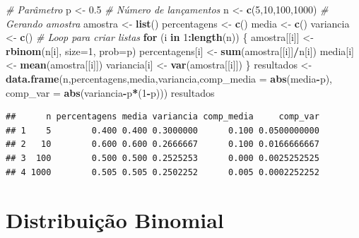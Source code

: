 \documentclass[
]{book}
\newenvironment{Shaded}{\begin{snugshade}}{\end{snugshade}}
\newcommand{\AttributeTok}[1]{\textcolor[rgb]{0.13,0.29,0.53}{#1}}
\newcommand{\CommentTok}[1]{\textcolor[rgb]{0.56,0.35,0.01}{\textit{#1}}}
\newcommand{\ControlFlowTok}[1]{\textcolor[rgb]{0.13,0.29,0.53}{\textbf{#1}}}
\newcommand{\DecValTok}[1]{\textcolor[rgb]{0.00,0.00,0.81}{#1}}
\newcommand{\FloatTok}[1]{\textcolor[rgb]{0.00,0.00,0.81}{#1}}
\newcommand{\FunctionTok}[1]{\textcolor[rgb]{0.13,0.29,0.53}{\textbf{#1}}}
\newcommand{\NormalTok}[1]{#1}
\newcommand{\OtherTok}[1]{\textcolor[rgb]{0.56,0.35,0.01}{#1}}
\newcommand{\SpecialCharTok}[1]{\textcolor[rgb]{0.81,0.36,0.00}{\textbf{#1}}}
\begin{document}
\begin{Shaded}
\begin{Highlighting}[]
\CommentTok{\# Parâmetro}
\NormalTok{p }\OtherTok{\textless{}{-}} \FloatTok{0.5}
\CommentTok{\# Número de lançamentos}
\NormalTok{n }\OtherTok{\textless{}{-}} \FunctionTok{c}\NormalTok{(}\DecValTok{5}\NormalTok{,}\DecValTok{10}\NormalTok{,}\DecValTok{100}\NormalTok{,}\DecValTok{1000}\NormalTok{)}
\CommentTok{\# Gerando amostra}
\NormalTok{amostra }\OtherTok{\textless{}{-}} \FunctionTok{list}\NormalTok{()}
\NormalTok{percentagens }\OtherTok{\textless{}{-}} \FunctionTok{c}\NormalTok{()}
\NormalTok{media }\OtherTok{\textless{}{-}} \FunctionTok{c}\NormalTok{()}
\NormalTok{variancia }\OtherTok{\textless{}{-}} \FunctionTok{c}\NormalTok{()}
\CommentTok{\# Loop para criar listas}
\ControlFlowTok{for}\NormalTok{ (i }\ControlFlowTok{in} \DecValTok{1}\SpecialCharTok{:}\FunctionTok{length}\NormalTok{(n)) \{}
\NormalTok{  amostra[[i]] }\OtherTok{\textless{}{-}} \FunctionTok{rbinom}\NormalTok{(n[i], }\AttributeTok{size=}\DecValTok{1}\NormalTok{, }\AttributeTok{prob=}\NormalTok{p)}
\NormalTok{  percentagens[i] }\OtherTok{\textless{}{-}} \FunctionTok{sum}\NormalTok{(amostra[[i]]}\SpecialCharTok{/}\NormalTok{n[i])}
\NormalTok{  media[i] }\OtherTok{\textless{}{-}} \FunctionTok{mean}\NormalTok{(amostra[[i]])}
\NormalTok{  variancia[i] }\OtherTok{\textless{}{-}} \FunctionTok{var}\NormalTok{(amostra[[i]])}
\NormalTok{\}}
\NormalTok{resultados }\OtherTok{\textless{}{-}} \FunctionTok{data.frame}\NormalTok{(n,percentagens,media,variancia,}\AttributeTok{comp\_media =} \FunctionTok{abs}\NormalTok{(media}\SpecialCharTok{{-}}\NormalTok{p), }\AttributeTok{comp\_var =} \FunctionTok{abs}\NormalTok{(variancia}\SpecialCharTok{{-}}\NormalTok{p}\SpecialCharTok{*}\NormalTok{(}\DecValTok{1}\SpecialCharTok{{-}}\NormalTok{p)))}
\NormalTok{resultados}
\end{Highlighting}
\end{Shaded}

\begin{verbatim}
##      n percentagens media variancia comp_media     comp_var
## 1    5        0.400 0.400 0.3000000      0.100 0.0500000000
## 2   10        0.600 0.600 0.2666667      0.100 0.0166666667
## 3  100        0.500 0.500 0.2525253      0.000 0.0025252525
## 4 1000        0.505 0.505 0.2502252      0.005 0.0002252252
\end{verbatim}

\section{Distribuição Binomial}\label{distribuiuxe7uxe3o-binomial}
\end{document}
